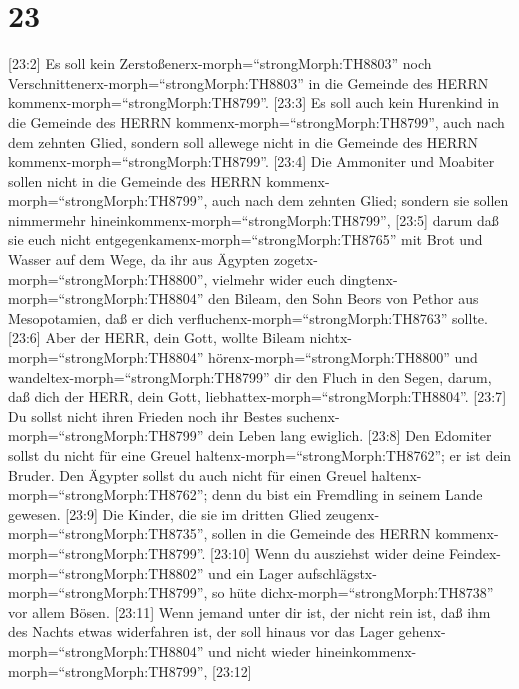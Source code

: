 \hypertarget{section-22}{%
\section{23}\label{section-22}}

 {[}23:2{]} Es soll kein
Zerstoßenerx-morph=``strongMorph:TH8803'' noch
Verschnittenerx-morph=``strongMorph:TH8803'' in die Gemeinde des HERRN
kommenx-morph=``strongMorph:TH8799''.  {[}23:3{]} Es soll
auch kein Hurenkind in die Gemeinde des HERRN
kommenx-morph=``strongMorph:TH8799'', auch nach dem zehnten Glied,
sondern soll allewege nicht in die Gemeinde des HERRN
kommenx-morph=``strongMorph:TH8799''.  {[}23:4{]} Die
Ammoniter und Moabiter sollen nicht in die Gemeinde des HERRN
kommenx-morph=``strongMorph:TH8799'', auch nach dem zehnten Glied;
sondern sie sollen nimmermehr
hineinkommenx-morph=``strongMorph:TH8799'',  {[}23:5{]}
darum daß sie euch nicht entgegenkamenx-morph=``strongMorph:TH8765'' mit
Brot und Wasser auf dem Wege, da ihr aus Ägypten
zogetx-morph=``strongMorph:TH8800'', vielmehr wider euch
dingtenx-morph=``strongMorph:TH8804'' den Bileam, den Sohn Beors von
Pethor aus Mesopotamien, daß er dich
verfluchenx-morph=``strongMorph:TH8763'' sollte.  {[}23:6{]}
Aber der HERR, dein Gott, wollte Bileam
nichtx-morph=``strongMorph:TH8804'' hörenx-morph=``strongMorph:TH8800''
und wandeltex-morph=``strongMorph:TH8799'' dir den Fluch in den Segen,
darum, daß dich der HERR, dein Gott,
liebhattex-morph=``strongMorph:TH8804''.  {[}23:7{]} Du
sollst nicht ihren Frieden noch ihr Bestes
suchenx-morph=``strongMorph:TH8799'' dein Leben lang ewiglich.
 {[}23:8{]} Den Edomiter sollst du nicht für eine Greuel
haltenx-morph=``strongMorph:TH8762''; er ist dein Bruder. Den Ägypter
sollst du auch nicht für einen Greuel
haltenx-morph=``strongMorph:TH8762''; denn du bist ein Fremdling in
seinem Lande gewesen.  {[}23:9{]} Die Kinder, die sie im
dritten Glied zeugenx-morph=``strongMorph:TH8735'', sollen in die
Gemeinde des HERRN kommenx-morph=``strongMorph:TH8799''. 
{[}23:10{]} Wenn du ausziehst wider deine
Feindex-morph=``strongMorph:TH8802'' und ein Lager
aufschlägstx-morph=``strongMorph:TH8799'', so hüte
dichx-morph=``strongMorph:TH8738'' vor allem Bösen. 
{[}23:11{]} Wenn jemand unter dir ist, der nicht rein ist, daß ihm des
Nachts etwas widerfahren ist, der soll hinaus vor das Lager
gehenx-morph=``strongMorph:TH8804'' und nicht wieder
hineinkommenx-morph=``strongMorph:TH8799'',  {[}23:12{]}
